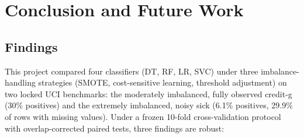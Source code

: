 
\section{Conclusion and Future Work}
%

\subsection{Findings}

This project compared four classifiers (DT, RF, LR, SVC) under three imbalance-handling strategies (SMOTE, cost-sensitive learning, threshold adjustment) on two locked UCI benchmarks: the moderately imbalanced, fully observed credit-g (30\% positives) and the extremely imbalanced, noisy sick (6.1\% positives, 29.9\% of rows with missing values). Under a frozen 10-fold cross-validation protocol with overlap-corrected paired tests, three findings are robust:

